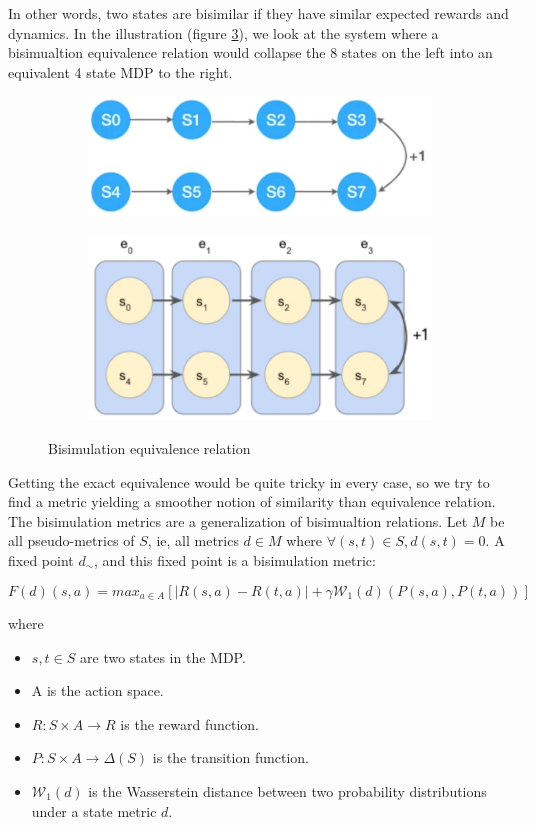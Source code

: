 \documentclass{usiinftr}
\begin{document}
In other words, two states are bisimilar if they have similar expected rewards and dynamics. In the illustration (figure \ref{fig:BisimulationEquivalence}), we look at the system where a bisimualtion equivalence relation would collapse the 8 states on the left into an equivalent 4 state MDP to the right.

\begin{figure}[h]
    \centering
    \begin{subfigure}
        \centering
        \includegraphics[width = 0.45\linewidth]{figures/image4.png}
        \label{}
    \end{subfigure}%
    \begin{subfigure}
        \centering
        \includegraphics[width = 0.5\linewidth]{figures/image5.png}
        \label{}
    \end{subfigure}
    \caption{Bisimulation equivalence relation}
    \label{fig:BisimulationEquivalence}
\end{figure}

Getting the exact equivalence would be quite tricky in every case, so we try to find a metric yielding a smoother notion of similarity than equivalence relation. The bisimulation metrics are a generalization of bisimualtion relations. Let $M$ be all pseudo-metrics of $S$, ie, all metrics $d \in M $ where $\forall (s,t) \in S, d(s,t)=0$.  A fixed point $d_{\sim}$, and this fixed point is a bisimulation metric:

\begin{equation}
    F(d)(s,a) = max_{a \in A} [|R(s,a) - R(t,a)| + \gamma \mathcal{W}_1 (d)(P(s,a),P(t,a))]
\end{equation}

where 
\begin{itemize}
    \item $s,t \in S$ are two states in the MDP.
    \item A is the action space.
    \item $R:S \times A \rightarrow R$ is the reward function.
    \item $P:S \times A \rightarrow \Delta(S)$ is the transition function.
    \item $\mathcal{W}_1 (d)$ is the Wasserstein distance between two probability distributions under a state metric $d$.
\end{itemize}
\end{document}
